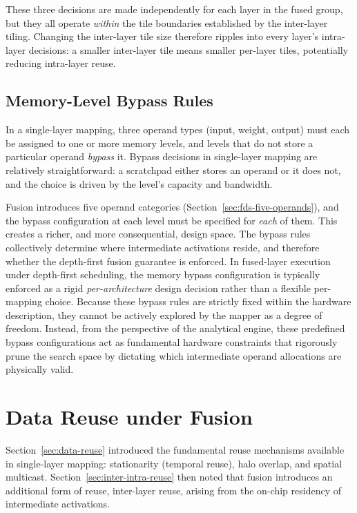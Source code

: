 These three decisions are made independently for each layer in the
fused group, but they all operate \emph{within} the tile boundaries
established by the inter-layer tiling.
Changing the inter-layer tile size therefore ripples into every
layer's intra-layer decisions: a smaller inter-layer tile means
smaller per-layer tiles, potentially reducing intra-layer reuse.


\subsection{Memory-Level Bypass Rules}
\label{sec:fds-bypass}

In a single-layer mapping, three operand types (input, weight, output) must each be assigned to one or more
memory levels, and levels that do not store a particular operand
\emph{bypass} it.
Bypass decisions in single-layer mapping are relatively
straightforward: a scratchpad either stores an operand or it
does not, and the choice is driven by the level's capacity and
bandwidth.

Fusion introduces five operand categories
(Section~\ref{sec:fds-five-operands}), and the bypass configuration
at each level must be specified for \emph{each} of them.
This creates a richer, and more consequential, design space.
The bypass rules collectively determine where intermediate
activations reside, and therefore whether the depth-first fusion
guarantee is enforced.
In fused-layer execution under depth-first scheduling, the memory bypass configuration is typically enforced as a rigid \emph{per-architecture} design decision rather than a flexible per-mapping choice. Because these bypass rules are strictly fixed within the hardware description, they cannot be actively explored by the mapper as a degree of freedom. Instead, from the perspective of the analytical engine, these predefined bypass configurations act as fundamental hardware constraints that rigorously prune the search space by dictating which intermediate operand allocations are physically valid.


\section{Data Reuse under Fusion}
\label{sec:fds-reuse}

Section~\ref{sec:data-reuse} introduced the fundamental reuse
mechanisms available in single-layer mapping: stationarity (temporal
reuse), halo overlap, and spatial multicast.
Section~\ref{sec:inter-intra-reuse} then noted that fusion introduces
an additional form of reuse, inter-layer reuse, arising from the
on-chip residency of intermediate activations.


